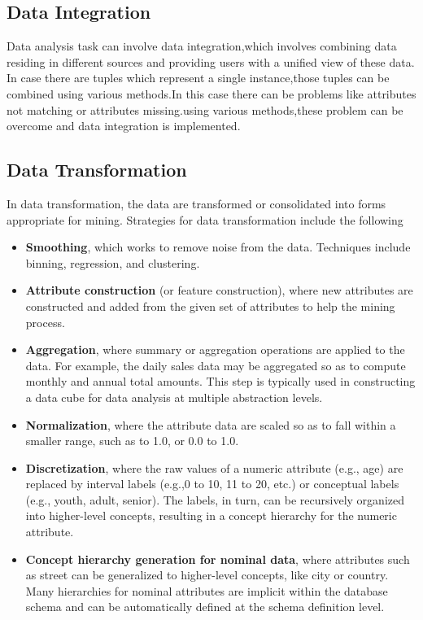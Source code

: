 \subsection{Data Integration}
Data analysis task can involve data integration,which involves combining data residing in different sources and providing users with a unified view of these data.\cite{Data Integration} In case there are tuples which represent a single instance,those tuples can be combined using various methods.In this case there can be problems like attributes not matching or attributes missing.using various methods,these problem can be overcome and data integration is implemented.

\subsection{Data Transformation}

In data transformation, the data are transformed or consolidated into forms appropriate for mining. Strategies
for data transformation include the following
\begin{itemize}

\item \textbf{Smoothing}, which works to remove noise from the data. Techniques include binning, regression, and
clustering.
\item \textbf{Attribute construction} (or feature construction), where new attributes are constructed and added from the given set of attributes to help the mining process.
\item \textbf{Aggregation}, where summary or aggregation operations are applied to the data. For example, the daily
sales data may be aggregated so as to compute monthly and annual total amounts. This step is typically used
in constructing a data cube for data analysis at multiple abstraction levels.
\item \textbf{Normalization}, where the attribute data are scaled so as to fall within a smaller range, such as   to 1.0, or 0.0 to 1.0.
\item \textbf{Discretization}, where the raw values of a numeric attribute (e.g., age) are replaced by interval labels (e.g.,0 to 10, 11 to 20, etc.) or conceptual labels (e.g., youth, adult, senior). The labels, in turn, can be recursively organized into higher-level concepts, resulting in a concept hierarchy for the numeric attribute.
\item \textbf{Concept hierarchy generation for nominal data}, where attributes such as street can be generalized to
higher-level concepts, like city or country. Many hierarchies for nominal attributes are implicit within the
database schema and can be automatically defined at the schema definition level.

\end{itemize}


